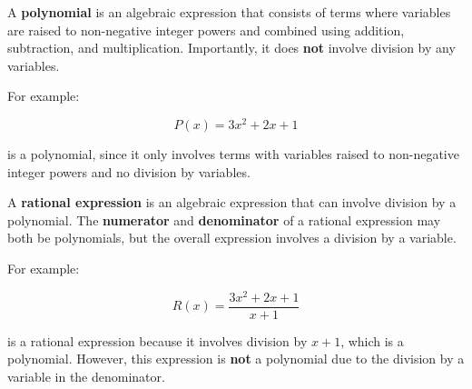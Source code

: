\documentclass{article}
\begin{document}
A \textbf{polynomial} is an algebraic expression that consists of terms where variables are raised to non-negative integer powers and combined using addition, subtraction, and multiplication. Importantly, it does \textbf{not} involve division by any variables.

For example:

\[
P(x) = 3x^2 + 2x + 1
\]

is a polynomial, since it only involves terms with variables raised to non-negative integer powers and no division by variables.

A \textbf{rational expression} is an algebraic expression that can involve division by a polynomial. The \textbf{numerator} and \textbf{denominator} of a rational expression may both be polynomials, but the overall expression involves a division by a variable.

For example:

\[
R(x) = \frac{3x^2 + 2x + 1}{x + 1}
\]

is a rational expression because it involves division by \(x + 1\), which is a polynomial. However, this expression is \textbf{not} a polynomial due to the division by a variable in the denominator.
\end{document}

